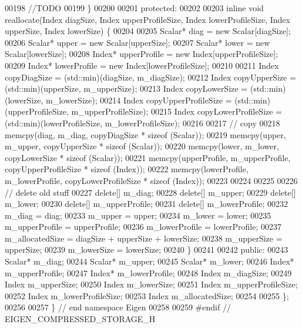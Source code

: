 \begin{DoxyCode}
00198         \textcolor{comment}{//TODO}
00199     \}
00200 
00201 \textcolor{keyword}{protected}:
00202 
00203     \textcolor{keyword}{inline} \textcolor{keywordtype}{void} reallocate(Index diagSize, Index upperProfileSize, Index lowerProfileSize, Index upperSize,
       Index lowerSize) \{
00204 
00205         Scalar* diag = \textcolor{keyword}{new} Scalar[diagSize];
00206         Scalar* upper = \textcolor{keyword}{new} Scalar[upperSize];
00207         Scalar* lower = \textcolor{keyword}{new} Scalar[lowerSize];
00208         Index* upperProfile = \textcolor{keyword}{new} Index[upperProfileSize];
00209         Index* lowerProfile = \textcolor{keyword}{new} Index[lowerProfileSize];
00210 
00211         Index copyDiagSize = (std::min)(diagSize, m\_diagSize);
00212         Index copyUpperSize = (std::min)(upperSize, m\_upperSize);
00213         Index copyLowerSize = (std::min)(lowerSize, m\_lowerSize);
00214         Index copyUpperProfileSize = (std::min)(upperProfileSize, m\_upperProfileSize);
00215         Index copyLowerProfileSize = (std::min)(lowerProfileSize, m\_lowerProfileSize);
00216 
00217         \textcolor{comment}{// copy}
00218         memcpy(diag, m\_diag, copyDiagSize * \textcolor{keyword}{sizeof} (Scalar));
00219         memcpy(upper, m\_upper, copyUpperSize * \textcolor{keyword}{sizeof} (Scalar));
00220         memcpy(lower, m\_lower, copyLowerSize * \textcolor{keyword}{sizeof} (Scalar));
00221         memcpy(upperProfile, m\_upperProfile, copyUpperProfileSize * \textcolor{keyword}{sizeof} (Index));
00222         memcpy(lowerProfile, m\_lowerProfile, copyLowerProfileSize * \textcolor{keyword}{sizeof} (Index));
00223 
00224 
00225 
00226         \textcolor{comment}{// delete old stuff}
00227         \textcolor{keyword}{delete}[] m\_diag;
00228         \textcolor{keyword}{delete}[] m\_upper;
00229         \textcolor{keyword}{delete}[] m\_lower;
00230         \textcolor{keyword}{delete}[] m\_upperProfile;
00231         \textcolor{keyword}{delete}[] m\_lowerProfile;
00232         m\_diag = diag;
00233         m\_upper = upper;
00234         m\_lower = lower;
00235         m\_upperProfile = upperProfile;
00236         m\_lowerProfile = lowerProfile;
00237         m\_allocatedSize = diagSize + upperSize + lowerSize;
00238         m\_upperSize = upperSize;
00239         m\_lowerSize = lowerSize;
00240     \}
00241 
00242 \textcolor{keyword}{public}:
00243     Scalar* m\_diag;
00244     Scalar* m\_upper;
00245     Scalar* m\_lower;
00246     Index* m\_upperProfile;
00247     Index* m\_lowerProfile;
00248     Index m\_diagSize;
00249     Index m\_upperSize;
00250     Index m\_lowerSize;
00251     Index m\_upperProfileSize;
00252     Index m\_lowerProfileSize;
00253     Index m\_allocatedSize;
00254 
00255 \};
00256 
00257 \} \textcolor{comment}{// end namespace Eigen}
00258 
00259 \textcolor{preprocessor}{#endif // EIGEN\_COMPRESSED\_STORAGE\_H}
\end{DoxyCode}
